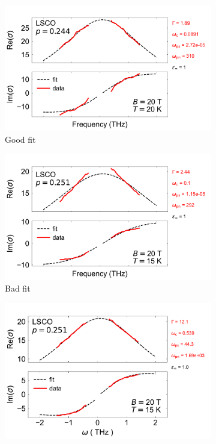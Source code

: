 \begin{figure}
    \centering
    \begin{subfigure}{0.49\textwidth}
        \includegraphics[width=\textwidth]{figures/drude_fit_good.pdf}
        \caption{Good fit}
        \label{fig:drude_fit_good}
    \end{subfigure}
    \begin{subfigure}{0.5\textwidth}
        \centering
        \includegraphics[width=\textwidth]{figures/drude_fit_bad.pdf}
        \caption{Bad fit}
        \label{fig:drude_fit_bad}
    \end{subfigure}
    \begin{subfigure}{0.49\textwidth}
        \centering
        \includegraphics[width=\textwidth]{figures/drude_fit_fixed.pdf}

\end{subfigure}
\end{figure}

